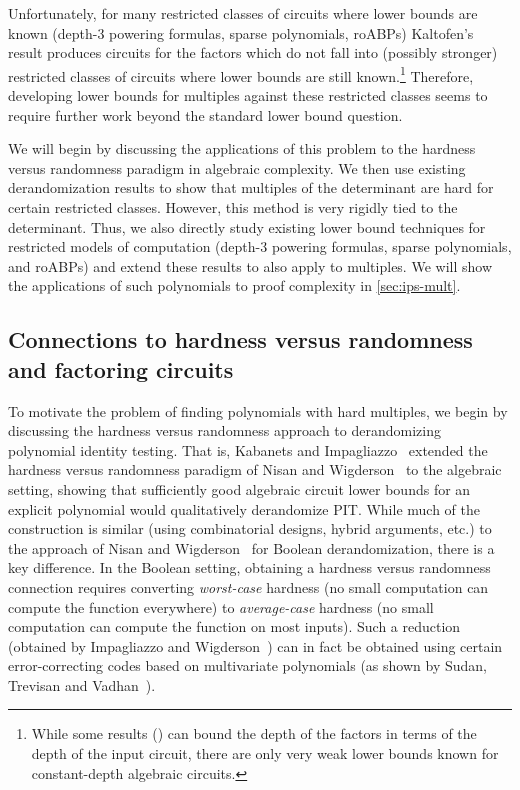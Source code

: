 \documentclass[11pt]{article}
\numberwithin{equation}{section}
\theoremstyle{definition}
\theoremstyle{plain}
\begin{document}
Unfortunately, for many restricted classes of circuits where lower bounds are known (depth-3 powering formulas, sparse polynomials, roABPs) Kaltofen's~\cite{Kaltofen89} result produces circuits for the factors which do not fall into (possibly stronger) restricted classes of circuits where lower bounds are still known.\footnote{While some results (\cite{DvirSY09,Oliveira15}) can bound the depth of the factors in terms of the depth of the input circuit, there are only very weak lower bounds known for constant-depth algebraic circuits.}
Therefore, %
developing lower bounds for multiples against these restricted classes seems to require further work beyond the standard lower bound question.

We will begin by discussing the applications of this problem to the hardness versus randomness paradigm in algebraic complexity.  We then use existing derandomization results to show that multiples of the determinant are hard for certain restricted classes. However, this method is very rigidly tied to the determinant.  Thus, we also directly study existing lower bound techniques for restricted models of computation (depth-$3$ powering formulas, sparse polynomials, and roABPs) and extend these results to also apply to multiples.  We will show the applications of such polynomials to proof complexity in \autoref{sec:ips-mult}.

\subsection{Connections to hardness versus randomness and factoring circuits}\label{sec:lbs-mult:hard-v-rand}

To motivate the problem of finding polynomials with hard multiples, we begin by discussing the hardness versus randomness approach to derandomizing polynomial identity testing.  That is, Kabanets and Impagliazzo~\cite{KabanetsImpagliazzo04} extended the hardness versus randomness paradigm of Nisan and Wigderson~\cite{NisanWigderson94} to the algebraic setting, showing that sufficiently good algebraic circuit lower bounds for an explicit polynomial would qualitatively derandomize PIT\@.  While much of the construction is similar (using combinatorial designs, hybrid arguments, etc.) to the approach of Nisan and Wigderson~\cite{NisanWigderson94} for Boolean derandomization, there is a key difference.  In the Boolean setting, obtaining a hardness versus randomness connection requires converting \emph{worst-case} hardness (no small computation can compute the function everywhere) to \emph{average-case} hardness (no small computation can compute the function on most inputs).  Such a reduction (obtained by Impagliazzo and Wigderson~\cite{ImpagliazzoWigderson97}) can in fact be obtained using certain error-correcting codes based on multivariate polynomials (as shown by Sudan, Trevisan and Vadhan~\cite{SudanTV01}).
\end{document}
